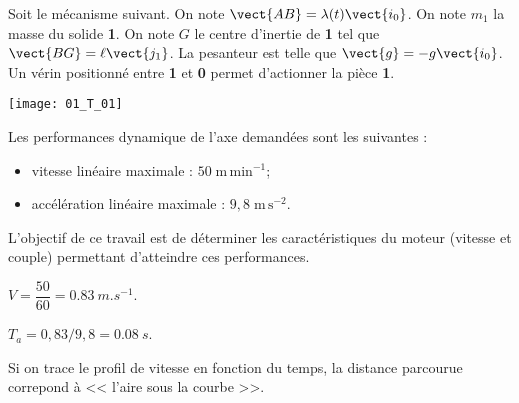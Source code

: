 \normaltrue
\correctionfalse


\setcounter{question}{0}%
\ifcorrection
\else
{}
\fi

\ifprof
\else
Soit le mécanisme suivant. On note $\vect{AB}=\lambda(t)\vect{i_0}$. On note $m_1$ la masse du solide \textbf{1}.
On note $G$ le centre d'inertie de \textbf{1} tel que $\vect{BG}=\ell \vect{j_1}$. La pesanteur est telle que $\vect{g}=-g\vect{i_0}$. Un vérin positionné entre \textbf{1} et \textbf{0} permet d'actionner la pièce \textbf{1}. 
\begin{marginfigure}
\texttt{[image: 01\_T\_01]}
\end{marginfigure}



Les performances dynamique de l'axe demandées sont les suivantes : 
\begin{itemize}
\item vitesse linéaire maximale : $50 \; \text{m}\,\text{min}^{-1}$;
\item accélération linéaire maximale : $9,8 \; \text{m}\, \text{s}^{-2}$.
\end{itemize}

\begin{obj}
L'objectif de ce travail est de déterminer les caractéristiques du moteur (vitesse et couple) permettant d'atteindre ces performances.
\end{obj}
\fi

\ifprof
$V = \dfrac{50}{60} = \SI{0,83}{m.s^{-1}}$.
\else
\fi

\ifprof
$T_a =0,83/9,8 = \SI{0,08}{s}$.


\else
\fi

\ifprof
Si on trace le profil de vitesse en fonction du temps, la distance parcourue correpond à << l'aire sous la courbe >>. 

